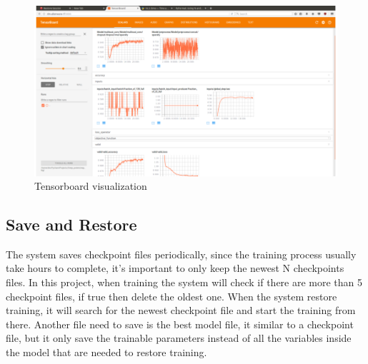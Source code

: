 \begin{figure}[H] 
	\centering
	\includegraphics[width=5in]{Figures/monitor}
	\caption[Tensorboard visualization]{Tensorboard visualization}
	\label{fig:monitor}
\end{figure}

\subsection{Save and Restore}
The system saves checkpoint files periodically, since the training process usually take hours to complete, it's important to only keep the newest N checkpoints files. In this project, when training the system will check if there are more than 5 checkpoint files, if true then delete the oldest one. When the system restore training, it will search for the newest checkpoint file and start the training from there. Another file need to save is the best model file, it similar to a checkpoint file, but it only save the trainable parameters instead of all the variables inside the model that are needed to restore training.